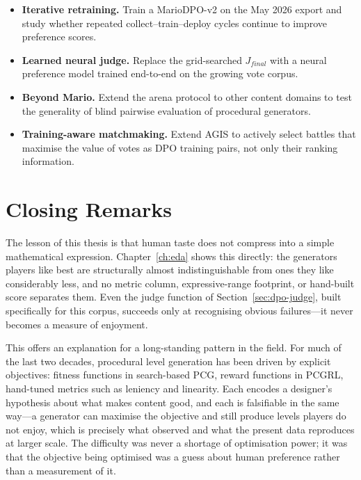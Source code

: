 \documentclass[shortabstract, mgr, english]{iithesis}
\begin{document}
\begin{itemize}
    \item \textbf{Iterative retraining.} Train a MarioDPO-v2 on the May 2026
          export and study whether repeated collect--train--deploy cycles
          continue to improve preference scores.
    \item \textbf{Learned neural judge.} Replace the grid-searched
          $J_{final}$ with a neural preference model trained end-to-end on the
          growing vote corpus.
    \item \textbf{Beyond Mario.} Extend the arena protocol to other content
          domains to test the generality of blind pairwise evaluation of
          procedural generators.
    \item \textbf{Training-aware matchmaking.} Extend AGIS to actively select
          battles that maximise the value of votes as DPO training pairs, not
          only their ranking information.
\end{itemize}

\section[Closing Remarks]{Closing Remarks}
\label{sec:conc-closing}

The lesson of this thesis is that human taste does not
compress into a simple mathematical expression. Chapter~\ref{ch:eda} shows
this directly: the generators players like best are structurally almost
indistinguishable from ones they like considerably less, and no metric column,
expressive-range footprint, or hand-built score separates them. Even the judge
function of Section~\ref{sec:dpo-judge}, built specifically for this corpus,
succeeds only at recognising obvious failures---it never becomes a measure of
enjoyment.

This offers an explanation for a long-standing pattern in the field.
For much of the last two decades, procedural level generation has been driven
by explicit objectives: fitness functions in search-based PCG, reward functions
in PCGRL, hand-tuned metrics such as leniency and linearity. Each encodes a
designer's hypothesis about what makes content good, and each is falsifiable in
the same way---a generator can maximise the objective and still produce levels
players do not enjoy, which is precisely what \citet{marino2015empirical}
observed and what the present data reproduces at larger scale. The difficulty
was never a shortage of optimisation power; it was that the objective being
optimised was a guess about human preference rather than a measurement of it.
\end{document}

